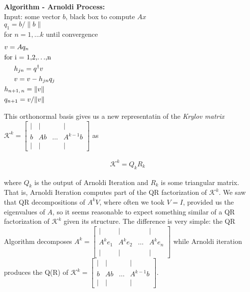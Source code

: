 \documentclass[11pt]{article}
\newcommand{\K}[1]{\mathcal{K}^{#1}}
\begin{document}
\begin{framed}
  \noindent \textbf{Algorithm - Arnoldi Process:} \\
  \hspace*{5mm} Input: some vector $b$, black box to compute $Ax$\\
  \hspace*{5mm} $q_1 = b / \| b \|$\\
  \hspace*{5mm} for $n=1,...k$ until convergence \\
  \begin{equation*}
    \begin{aligned}
      &v = A q_n \\
      &\textrm{for i = 1,2,$\hdots$,n} \\
      &\hspace{5mm} h_{jn} = q^\dagger v \\
      &\hspace{5mm} v = v - h_{jn} q_j \\
      &h_{n+1, \, n} = \| v \| \\
      &q_{n+1} = v / \| v \| \\
    \end{aligned}
    \phantom{\hspace{10cm}}
  \end{equation*}
\end{framed}

This orthonormal basis gives us a new representatin of the \textit{Krylov matrix} $\K{k} = \begin{bmatrix} | & | & & | \\ b & Ab & \hdots & A^{k-1}b \\ | & | & & | \end{bmatrix}$ as 

\begin{align*}
  \K{k} = Q_k R_k
\end{align*}

where $Q_k$ is the output of Arnoldi Iteration and $R_k$ is some triangular matrix. That is, Arnoldi Iteration computes part of the QR factorization of $\K{k}$. We saw that QR decompositions of $A^k V$, where often we took $V = I$, provided us the eigenvalues of $A$, so it seems reasonable to expect something similar of a QR factorization of $\K{k}$ given its structure. The difference is very simple: the QR Algorithm decomposes $A^k = \begin{bmatrix} | & | & & | \\ A^ke_1 & A^ke_2 & \hdots & A^ke_n \\ | & | & & | \end{bmatrix}$ while Arnoldi iteration produces the Q(R) of $\K{k} = \begin{bmatrix} | & | & & | \\ b & Ab & \hdots & A^{k-1}b \\ | & | & & | \end{bmatrix}$. \\
\end{document}
